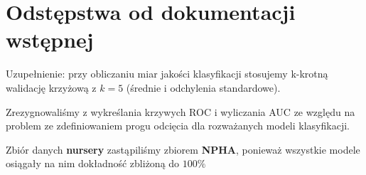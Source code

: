 \documentclass{article}
\begin{document}
\section{Odstępstwa od dokumentacji wstępnej}

Uzupełnienie: przy obliczaniu miar jakości klasyfikacji stosujemy k-krotną walidację krzyżową z $k=5$ (średnie i odchylenia standardowe).

Zrezygnowaliśmy z wykreślania krzywych ROC i wyliczania AUC ze względu na problem ze zdefiniowaniem progu odcięcia dla rozważanych
modeli klasyfikacji.

Zbiór danych \textbf{nursery} zastąpiliśmy zbiorem \textbf{NPHA}, ponieważ wszystkie modele osiągały na nim dokładność zbliżoną do $100\%$
\end{document}
